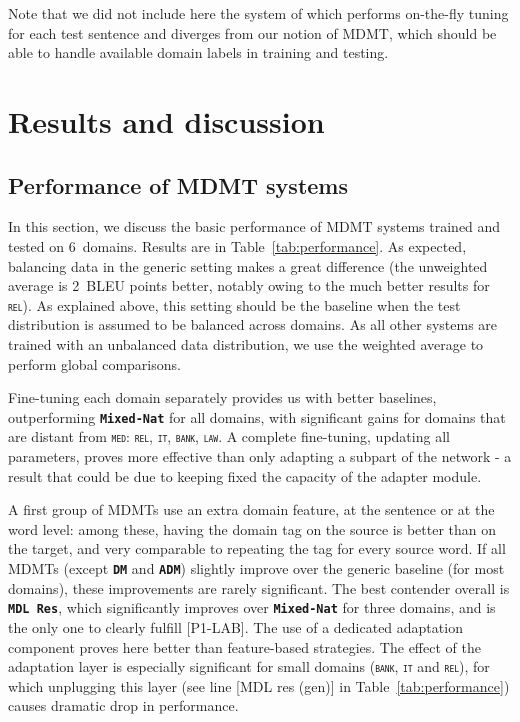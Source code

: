\documentclass[11pt,a4paper]{article}
\newcommand{\fyDone}[1]{\done[FY]\Todo[FY:]{\textcolor{orange}{#1}}}
\newcommand{\jcDone}[1]{\done[JC]\Todo[JC:]{\textcolor{blue}{#1}}}
\newcommand{\domain}[1]{\texttt{\textsc{#1}}}
\newcommand{\system}[1]{\texttt{\textbf{#1}}}
\begin{document}
Note that we did not include here the system of \cite{Farajian17multidomain} which performs on-the-fly tuning for each test sentence and diverges from our notion of MDMT, which should be able to handle available domain labels in training and testing.

\section{Results and discussion \label{sec:results}}

\subsection{Performance of MDMT systems \label{ssec:rawperformance}}
In this section, we discuss the basic performance of MDMT systems trained and tested on $6$~domains. Results are in Table~\ref{tab:performance}. As expected, balancing data in the generic setting makes a great difference (the unweighted average is 2~BLEU points\jcDone{BP?} better, notably owing to the much better results for \domain{rel}). As explained above, this setting should be the baseline when the test distribution is assumed to be balanced across domains. As all other systems are trained with an unbalanced data distribution, we use the weighted average to perform global comparisons.

Fine-tuning each domain separately provides us with better baselines, outperforming \system{Mixed-Nat} for all domains, with significant gains for domains that are distant from \domain{med}: \domain{rel}, \domain{it}, \domain{bank}, \domain{law}. A complete fine-tuning, updating all parameters, proves more effective than only adapting a subpart of the network - a result that could be due to keeping fixed the capacity of the adapter module.\fyDone{Add 2 averages ?}\fyDone{Significance testing wrt Mix Generic, Full Fine-tuned, for each domain}

A  first group of MDMTs use an extra domain feature, at the sentence or at the word level: among these, having the domain tag on the source is better than on the target, and very comparable to repeating the tag for every source word. If all MDMTs (except \system{DM} and \system{ADM}) slightly improve over the generic baseline (for most domains), these improvements are rarely significant. The best contender overall is \system{MDL Res}, which significantly improves over \system{Mixed-Nat} for three domains, and is the only one to clearly fulfill [P1-LAB]. The use of a dedicated adaptation component proves here better than feature-based strategies. The effect of the adaptation layer is especially significant for small domains (\domain{bank}, \domain{it} and \domain{rel}), for which unplugging this layer (see line [MDL res (gen)] in Table~\ref{tab:performance}) causes dramatic drop in performance. 
\end{document}
